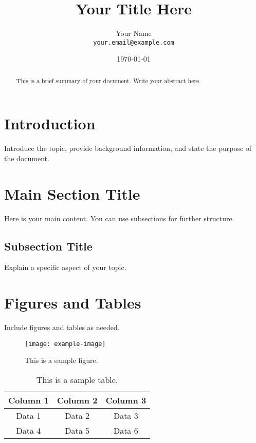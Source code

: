 \documentclass[12pt,a4paper]{article}
\begin{document}
\title{Your Title Here}
\author{Your Name \\ \texttt{your.email@example.com}}
\date{\today}
\maketitle

\begin{abstract}
This is a brief summary of your document. Write your abstract here.
\end{abstract}

\section{Introduction}
Introduce the topic, provide background information, and state the purpose of the document.

\section{Main Section Title}
Here is your main content. You can use subsections for further structure.

\subsection{Subsection Title}
Explain a specific aspect of your topic.

\section{Figures and Tables}
Include figures and tables as needed. 

\begin{figure}[h]
    \centering
    \texttt{[image: example-image]} %
    \caption{This is a sample figure.}
    \label{fig:sample}
\end{figure}

\begin{table}[h]
    \centering
    \begin{tabular}{|c|c|c|}
        \hline
        Column 1 & Column 2 & Column 3 \\
        \hline
        Data 1 & Data 2 & Data 3 \\
        Data 4 & Data 5 & Data 6 \\
        \hline
    \end{tabular}
    \caption{This is a sample table.}
    \label{tab:sample}
\end{table}
\end{document}

